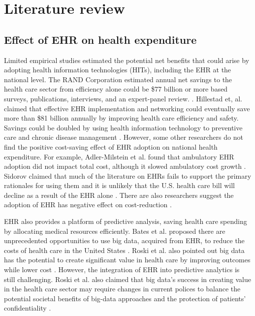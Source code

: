 \section{Literature review}

\subsection{Effect of EHR on health expenditure}

Limited empirical studies estimated the potential net benefits that could arise by adopting health information technologies (HITs), including the EHR at the national level. The RAND Corporation estimated annual net savings to the health care sector from efficiency alone could be \$77 billion or more based surveys, publications, interviews, and an expert-panel review. \citep{Rand2005}. Hillestad et, al. claimed that effective EHR implementation and networking could eventually save more than \$81 billion annually by improving health care efficiency and safety. Savings could be doubled by using health information technology to preventive care and chronic disease management \citep{Hillestad2005}. However, some other researchers do not find the positive cost-saving effect of EHR adoption on national health expenditure. For example, Adler-Milstein et al. found that ambulatory EHR adoption did not impact total cost, although it slowed ambulatory cost growth \citep{Adler-Milstein2013}. Sidorov claimed that much of the literature on EHRs fails to support the primary rationales for using them and it is unlikely that the U.S. health care bill will decline as a result of the EHR alone \citep{Sidorov2006}. There are also researchers suggest the adoption of EHR has negative effect on cost-reduction  \citep{Teufel2012}.

EHR also provides a platform of predictive analysis, saving health care spending by allocating medical resources efficiently. Bates et al. proposed there are unprecedented opportunities to use big data, acquired from EHR, to reduce the costs of health care in the United States \citep{Bates2014}. Roski et al. also pointed out big data has the potential to create significant value in health care by improving outcomes while lower cost \citep{Roski2014}. However, the integration of EHR into predictive analytics is still challenging. Roski et al. also claimed that big data's success in creating value in the health care sector may require changes in current polices to balance the potential societal benefits of big-data approaches and the protection of patients' confidentiality \citep{Roski2014}.


